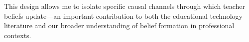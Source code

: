 \documentclass[hidelinks,12pt]{article}
\begin{document}
\begin{singlespace}
This design allows me to isolate specific causal channels through which teacher beliefs update—an important contribution to both the educational technology literature and our broader understanding of belief formation in professional contexts.
\end{singlespace}
\end{document}
